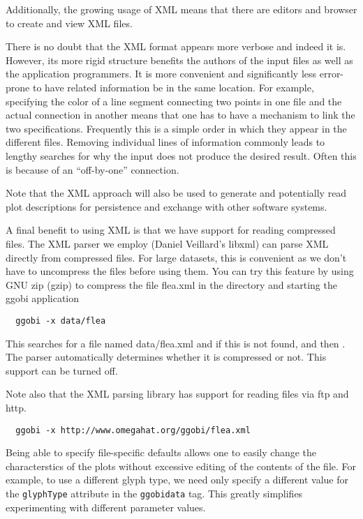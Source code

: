 \documentclass{article}
\begin{document}
Additionally, the growing usage of XML means that there are editors
and browser to create and view XML files.

There is no doubt that the XML format appears more verbose and indeed
it is. However, its more rigid structure benefits the authors of the
input files as well as the application programmers.  It is more
convenient and significantly less error-prone to have related
information be in the same location.  For example, specifying the
color of a line segment connecting two points in one file and the
actual connection in another means that one has to have a mechanism to
link the two specifications. Frequently this is a simple order in
which they appear in the different files.  Removing individual lines
of information commonly leads to lengthy searches for why the input
does not produce the desired result.  Often this is because of an
``off-by-one'' connection.


Note that the XML approach will also be used to generate and
potentially read plot descriptions for persistence and exchange with
other software systems.


A final benefit to using XML is that we have support for reading
compressed files.  The XML parser we employ (Daniel Veillard's libxml)
can parse XML directly from compressed files.  For large datasets,
this is convenient as we don't have to uncompress the files before
using them.  You can try this feature by using GNU zip (gzip)
to compress the file flea.xml in the 
directory and starting the ggobi application
\begin{verbatim}
  ggobi -x data/flea
\end{verbatim}
This searches for a file named data/flea.xml and if this is not found,
 and then .  The parser
automatically determines whether it is compressed or not.  This
support can be turned off.

Note also that the XML parsing library has support for reading files
via ftp and http.
\begin{verbatim}
  ggobi -x http://www.omegahat.org/ggobi/flea.xml
\end{verbatim}



Being able to specify file-specific defaults allows one to easily
change the characterstics of the plots without excessive editing of
the contents of the file.  For example, to use a different glyph type,
we need only specify a different value for the \texttt{glyphType}
attribute in the \texttt{ggobidata} tag.  This greatly simplifies
experimenting with different parameter values.
\end{document}
